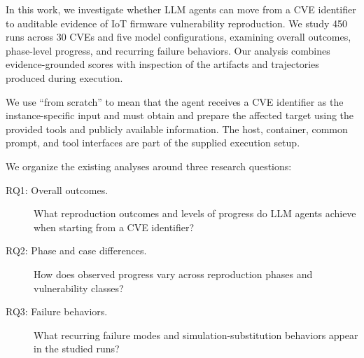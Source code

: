 In this work, we investigate whether LLM agents can move from a CVE identifier to auditable evidence of IoT firmware vulnerability reproduction. We study 450 runs across 30 CVEs and five model configurations, examining overall outcomes, phase-level progress, and recurring failure behaviors. Our analysis combines evidence-grounded scores with inspection of the artifacts and trajectories produced during execution.

We use ``from scratch'' to mean that the agent receives a CVE identifier as the instance-specific input and must obtain and prepare the affected target using the provided tools and publicly available information. The host, container, common prompt, and tool interfaces are part of the supplied execution setup.

We organize the existing analyses around three research questions:
\begin{description}
\item[RQ1: Overall outcomes.] What reproduction outcomes and levels of progress do LLM agents achieve when starting from a CVE identifier?
\item[RQ2: Phase and case differences.] How does observed progress vary across reproduction phases and vulnerability classes?
\item[RQ3: Failure behaviors.] What recurring failure modes and simulation-substitution behaviors appear in the studied runs?
\end{description}

